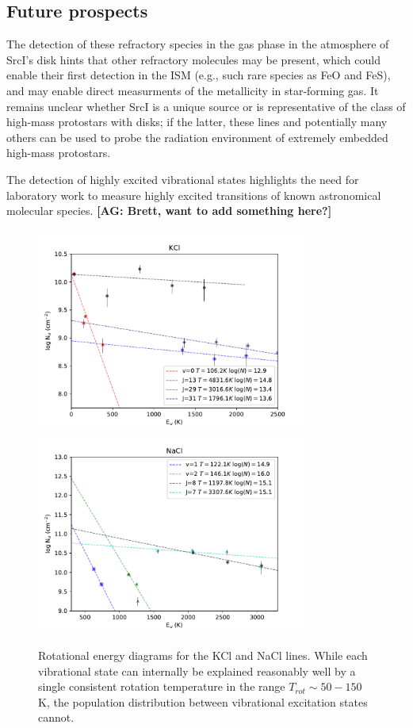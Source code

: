 \documentclass[twocolumn]{aastex62}
\newcommand{\sourcei}{SrcI\xspace}
\newcommand{\ag}[1]{\textcolor{red!65!black}{\textbf{[AG: #1]}}}
\begin{document}
\subsection{Future prospects}
The detection of these refractory species in the gas phase in the atmosphere
of \sourcei's disk hints that other refractory molecules may be present, 
which could enable their first detection in the ISM (e.g., such rare species as
FeO and FeS), and may enable direct measurments of the metallicity in
star-forming gas.
It remains unclear whether \sourcei is a unique source or is representative
of the class of high-mass protostars with disks; if the latter, these lines
and potentially many others can be used to probe the radiation environment of 
extremely embedded high-mass protostars.  

The detection of highly excited vibrational states highlights the need for
laboratory work to measure highly excited transitions of known astronomical
molecular species.  \ag{Brett, want to add something here?}

\begin{figure}[!htp]
\includegraphics[scale=1,width=3.5in]{figures/KCl_rotational_diagrams.pdf}
\includegraphics[scale=1,width=3.5in]{figures/NaCl_rotational_diagrams.pdf}
\caption{Rotational energy diagrams for the KCl and NaCl lines.  While each
vibrational state can internally be explained reasonably well by a single
consistent rotation temperature in the range $T_{rot}\sim50-150$ K, the population
distribution between vibrational excitation states cannot.}
\label{fig:rotationdiagrams}
\end{figure}
\end{document}
